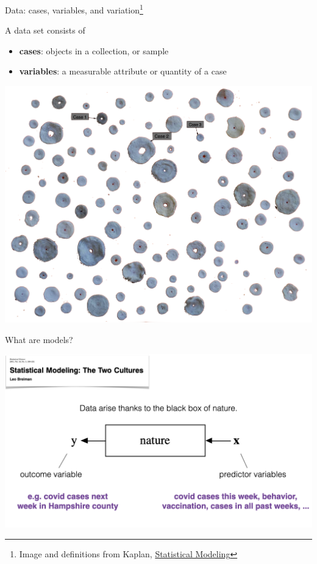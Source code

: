 \documentclass[table]{beamer}\usepackage[]{graphicx}\usepackage[]{color}
\begin{document}
\begin{frame}{Data: cases, variables, and variation\footnote{Image and definitions from Kaplan, \href{https://dtkaplan.github.io/SM2-bookdown/data-cases-variables-samples.html}{Statistical Modeling}}}


\begin{block}{A data set consists of}

\begin{itemize}
	\item {\bf cases}: objects in a collection, or sample
	\item {\bf variables}: a measurable attribute or quantity of a case
\end{itemize}

\includegraphics[width=.48\textwidth]{figure-static/shell-collection2.png}


\end{block}


\end{frame}

\begin{frame}{What are models?}

\includegraphics[width=\textwidth]{figure-static/models1.jpeg}


\end{frame}
\end{document}
